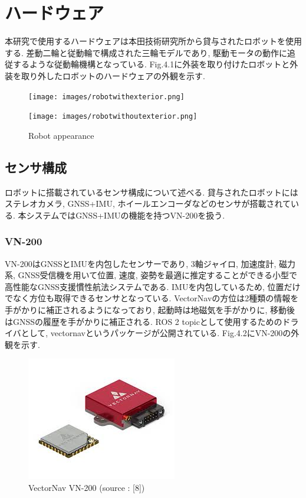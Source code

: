
\section{ハードウェア}
本研究で使用するハードウェアは本田技術研究所から貸与されたロボットを使用する.
差動二輪と従動輪で構成された三輪モデルであり, 駆動モータの動作に追従するような従動輪機構となっている.
Fig.4.1に外装を取り付けたロボットと外装を取り外したロボットのハードウェアの外観を示す.

\begin{figure}[h]
     \centering
     \begin{minipage}[c]{65mm}
         \centering
         \texttt{[image: images/robotwithexterior.png]}
     \end{minipage}
     \begin{minipage}[c]{65mm}
         \centering
         \texttt{[image: images/robotwithoutexterior.png]}
     \end{minipage}
     \caption{Robot appearance}
     \label{Fig:RobotGuidance_velocity}
\end{figure}

\subsection{センサ構成}
ロボットに搭載されているセンサ構成について述べる.
貸与されたロボットにはステレオカメラ, GNSS+IMU, ホイールエンコーダなどのセンサが搭載されている.
本システムではGNSS+IMUの機能を持つVN-200を扱う.

\subsubsection{VN-200}
VN-200\cite{vn-200}はGNSSとIMUを内包したセンサーであり, 3軸ジャイロ, 加速度計, 磁力系, GNSS受信機を用いて位置, 速度, 姿勢を最適に推定することができる小型で高性能なGNSS支援慣性航法システムである.
IMUを内包しているため, 位置だけでなく方位も取得できるセンサとなっている.
VectorNavの方位は2種類の情報を手がかりに補正されるようになっており, 起動時は地磁気を手がかりに, 移動後はGNSSの履歴を手がかりに補正される.
ROS 2 topicとして使用するためのドライバとして, vectornavというパッケージが公開されている.\cite{vectornav}
Fig.4.2にVN-200の外観を示す.

\begin{figure}[H]
  \centering
 \includegraphics[keepaspectratio, scale=0.6]
      {images/vn-200.png}
 \caption{VectorNav VN-200 (source : [8])}
 \label{fig:vn-200 view}
\end{figure}

